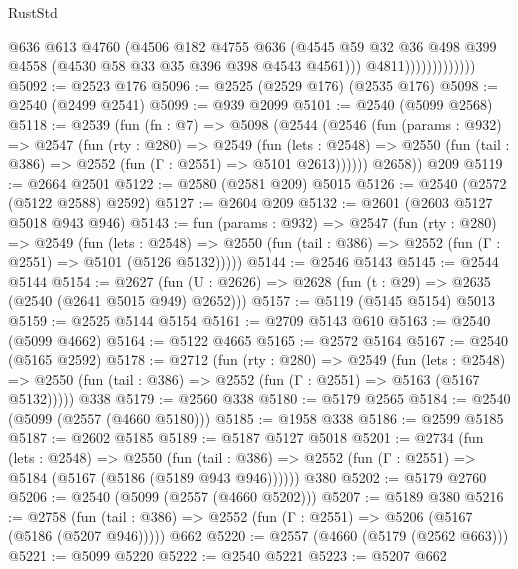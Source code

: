 \begin{lexlean}{RustStd}
\begin{coremodule}
                              @636
                              @613
                              @4760
                              (@4506
                                @182
                                @4755
                                @636
                                (@4545
                                  @59
                                  @32
                                  @36
                                  @498
                                  @399
                                  @4558
                                  (@4530 @58 @33 @35 @396 @398 @4543 @4561)))
                              @4811)))))))))))))
@5092 := @2523 @176
@5096 := @2525 (@2529 @176) (@2535 @176)
@5098 := @2540 (@2499 @2541)
@5099 := @939 @2099
@5101 := @2540 (@5099 @2568)
@5118 := @2539
    (fun (fn : @7) =>
    @5098
      (@2544
        (@2546
          (fun (params : @932) =>
          @2547
            (fun (rty : @280) =>
            @2549
              (fun (lets : @2548) =>
              @2550 (fun (tail : @386) => @2552 (fun (Γ : @2551) => @5101 @2613))))))
        @2658))
    @209
@5119 := @2664 @2501
@5122 := @2580 (@2581 @209) @5015
@5126 := @2540 (@2572 (@5122 @2588) @2592)
@5127 := @2604 @209
@5132 := @2601 (@2603 @5127 @5018 @943 @946)
@5143 := fun (params : @932) =>
  @2547
    (fun (rty : @280) =>
    @2549
      (fun (lets : @2548) =>
      @2550 (fun (tail : @386) => @2552 (fun (Γ : @2551) => @5101 (@5126 @5132)))))
@5144 := @2546 @5143
@5145 := @2544 @5144
@5154 := @2627 (fun (U : @2626) => @2628 (fun (t : @29) => @2635 (@2540 (@2641 @5015 @949) @2652)))
@5157 := @5119 (@5145 @5154) @5013
@5159 := @2525 @5144 @5154
@5161 := @2709 @5143 @610
@5163 := @2540 (@5099 @4662)
@5164 := @5122 @4665
@5165 := @2572 @5164
@5167 := @2540 (@5165 @2592)
@5178 := @2712
    (fun (rty : @280) =>
    @2549
      (fun (lets : @2548) =>
      @2550 (fun (tail : @386) => @2552 (fun (Γ : @2551) => @5163 (@5167 @5132)))))
    @338
@5179 := @2560 @338
@5180 := @5179 @2565
@5184 := @2540 (@5099 (@2557 (@4660 @5180)))
@5185 := @1958 @338
@5186 := @2599 @5185
@5187 := @2602 @5185
@5189 := @5187 @5127 @5018
@5201 := @2734
    (fun (lets : @2548) =>
    @2550 (fun (tail : @386) => @2552 (fun (Γ : @2551) => @5184 (@5167 (@5186 (@5189 @943 @946))))))
    @380
@5202 := @5179 @2760
@5206 := @2540 (@5099 (@2557 (@4660 @5202)))
@5207 := @5189 @380
@5216 := @2758
    (fun (tail : @386) => @2552 (fun (Γ : @2551) => @5206 (@5167 (@5186 (@5207 @946)))))
    @662
@5220 := @2557 (@4660 (@5179 (@2562 @663)))
@5221 := @5099 @5220
@5222 := @2540 @5221
@5223 := @5207 @662

\end{coremodule}
\end{lexlean}
